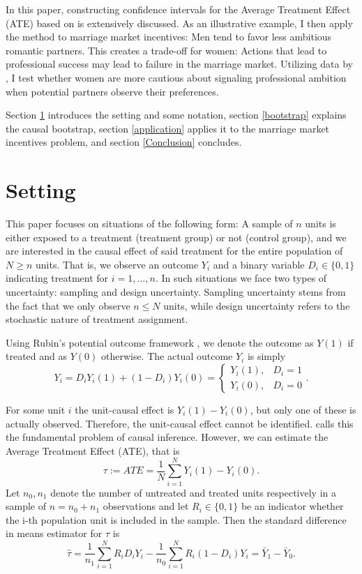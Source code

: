 \documentclass[aodsor,preprint]{imsart}
\numberwithin{equation}{section}
\theoremstyle{plain}
\begin{document}
In this paper, constructing confidence intervals for the Average Treatment Effect (ATE) based on \cite{Imbens_2021} is extensively discussed. As an illustrative example, I then apply the method to marriage market incentives: Men tend to favor less ambitious romantic partners. This creates a trade-off for women: Actions that lead to professional success may lead to failure in the marriage market. Utilizing data by \cite{Bursztyn_2017}, I test whether women are more cautious about signaling professional ambition when potential partners observe their preferences.

Section \ref{setting} introduces the setting and some notation, section \ref{bootstrap} explains the causal bootstrap, section \ref{application} applies it to the marriage market incentives problem, and section \ref{Conclusion} concludes.



\section{Setting} \label{setting}

This paper focuses on situations of the following form: A sample of $n$ units is either exposed to a treatment (treatment group) or not (control group), and we are interested in the causal effect of said treatment for the entire population of $N \geq n$ units. That is, we observe an outcome $Y_i$ and a binary variable $D_i \in \{0, 1\}$ indicating treatment for $i = 1,\ldots, n$. In such situations we face two types of uncertainty: sampling and design uncertainty. Sampling uncertainty stems from the fact that we only observe $n \leq N$ units, while design uncertainty refers to the stochastic nature of treatment assignment.

Using Rubin's potential outcome framework \citep{Rubin_2005}, we denote the outcome as $Y(1)$ if treated and as $Y(0)$ otherwise. The actual outcome $Y_i$ is simply
$$
Y_i = D_i Y_i(1) + (1-D_i) Y_i(0) = \begin{cases}
	Y_i(1), & D_i = 1 \\
	Y_i(0), & D_i = 0
\end{cases}.
$$

For some unit $i$ the unit-causal effect is $Y_i(1) - Y_i(0)$, but only one of these is actually observed. Therefore, the unit-causal effect cannot be identified. \cite{Holland_1986} calls this the fundamental problem of causal inference. However, we can estimate the Average Treatment Effect (ATE), that is
$$
\tau := ATE = \frac{1}{N} \sum_{i = 1}^{N} Y_i(1) - Y_i(0).
$$
Let $n_0, n_1$ denote the number of untreated and treated units respectively in a sample of $n = n_0 + n_1$ observations and let $R_i \in \{0, 1\}$ be an indicator whether the i-th population unit is included in the sample. Then the standard difference in means estimator for $\tau$ is
$$
\widehat{\tau} = \frac{1}{n_1} \sum_{i = 1}^{N} R_i D_i Y_i - \frac{1}{n_0} \sum_{i = 1}^{N} R_i (1 - D_i) Y_i = \bar{Y}_1 - \bar{Y}_0.
$$
\end{document}
